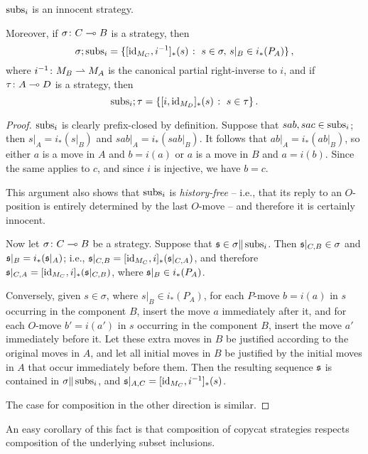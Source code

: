 \documentclass[11pt]{report}
\begin{document}
\begin{proposition}
  $\operatorname{subs}_i$ is an innocent strategy.

  Moreover, if $\sigma\colon C \multimap B$ is a strategy, then
  \[
    \sigma;\operatorname{subs}_i = \{[\operatorname{id}_{M_C},i^{-1}]_*(s)\;\colon\; s\in\sigma,\,s\vert_B\in i_*(P_A)\}\,,
    \]
  where $i^{-1}\colon M_B \rightharpoonup M_A$ is the canonical partial right-inverse to $i$, and if $\tau \colon A \multimap D$ is a strategy, then
  \[
    \operatorname{subs}_i;\tau = \{[i,\operatorname{id}_{M_D}]_*(s)\;\colon\; s\in\tau\}\,.
    \]
  \label{PropCopycat}
\end{proposition}
\begin{proof}
  $\operatorname{subs}_i$ is clearly prefix-closed by definition.  
  Suppose that $sab,sac\in\operatorname{subs}_i$; then $s\vert_A=i_*(s\vert_B)$ and $sab\vert_A=i_*(sab\vert_B)$.  
  It follows that $ab\vert_A=i_*(ab\vert_B)$, so either $a$ is a move in $A$ and $b=i(a)$ or $a$ is a move in $B$ and $a=i(b)$.  
  Since the same applies to $c$, and since $i$ is injective, we have $b=c$.

  This argument also shows that $\operatorname{subs}_i$ is \emph{history-free} -- i.e., that its reply to an $O$-position is entirely determined by the last $O$-move -- and therefore it is certainly innocent.

  Now let $\sigma \colon C \multimap B$ be a strategy.  
  Suppose that $\mathfrak s\in\sigma\|\operatorname{subs}_i$.  
  Then $\mathfrak s\vert_{C,B}\in\sigma$ and $\mathfrak s\vert_B=i_*(\mathfrak s\vert_A)$; i.e., $\mathfrak s\vert_{C,B}=[\operatorname{id}_{M_C},i]_*(\mathfrak s\vert_{C,A})$, and therefore $\mathfrak s\vert_{C,A}=[\operatorname{id}_{M_C},i]_*(\mathfrak s\vert_{C,B})$, where $\mathfrak s\vert_B\in i_*(P_A)$.

  Conversely, given $s\in\sigma$, where $s\vert_B\in i_*(P_A)$, for each $P$-move $b=i(a)$ in $s$ occurring in the component $B$, insert the move $a$ immediately after it, and for each $O$-move $b'=i(a')$ in $s$ occurring in the component $B$, insert the move $a'$ immediately before it.
  Let these extra moves in $B$ be justified according to the original moves in $A$, and let all initial moves in $B$ be justified by the initial moves in $A$ that occur immediately before them.
  Then the resulting sequence $\mathfrak s$ is contained in $\sigma\|\operatorname{subs}_i$, and $\mathfrak s\vert_{A,C}=[\operatorname{id}_{M_C},i^{-1}]_*(s)$.

  The case for composition in the other direction is similar.
\end{proof}

An easy corollary of this fact is that composition of copycat strategies respects composition of the underlying subset inclusions.
\end{document}
